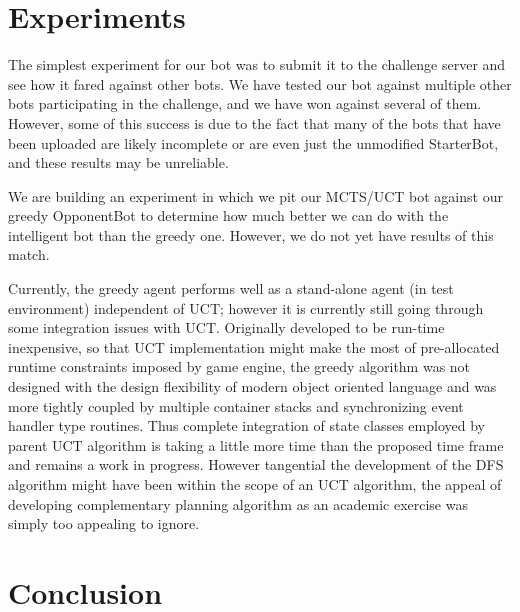 \documentclass[a4paper,11pt]{article}
\begin{document}
\section{Experiments}\label{sec:experiments}
The simplest experiment for our bot was to submit it to the challenge server and see how it 
fared against other bots.  We have tested our bot against multiple other bots participating 
in the challenge, and we have won against several of them.  However, some of this success is 
due to the fact that many of the bots that have been uploaded are likely incomplete or are 
even just the unmodified StarterBot, and these results may be unreliable.

We are building an experiment in which we pit our MCTS/UCT bot against our greedy 
OpponentBot to determine how much better we can do with the intelligent bot than the greedy 
one.  However, we do not yet have results of this match.

Currently, the greedy agent performs well as a stand-alone agent (in test environment) 
independent of UCT; however it is currently still going through some integration issues with 
UCT. Originally developed to be run-time inexpensive, so that UCT implementation might make 
the most of pre-allocated runtime constraints imposed by game engine, the greedy algorithm 
was not designed with the design flexibility of modern object oriented language and was more 
tightly coupled by multiple container stacks and synchronizing event handler type routines. 
Thus complete integration of state classes employed by parent UCT algorithm is taking a 
little more time than the proposed time frame and remains a work in progress. However 
tangential the development of the DFS algorithm might have been within the scope of an UCT 
algorithm, the appeal of developing complementary planning algorithm as an academic exercise 
was simply too appealing to ignore.

\section{Conclusion}\label{sec:conclusion}




\newpage
\end{document}
